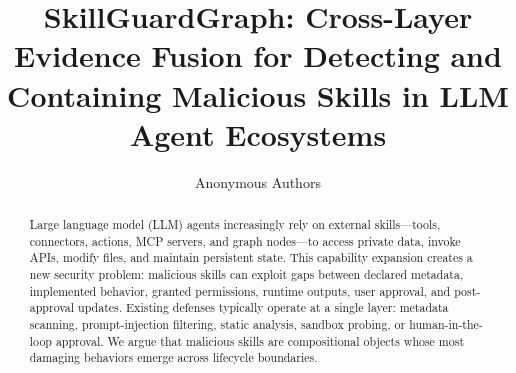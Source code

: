 \documentclass[10pt]{article}
\title{SkillGuardGraph: Cross-Layer Evidence Fusion for Detecting and Containing Malicious Skills in LLM Agent Ecosystems}
\author{Anonymous Authors}
\date{}
\begin{document}
\maketitle

\begin{abstract}
Large language model (LLM) agents increasingly rely on external skills---tools, connectors, actions, MCP servers, and graph nodes---to access private data, invoke APIs, modify files, and maintain persistent state. This capability expansion creates a new security problem: malicious skills can exploit gaps between declared metadata, implemented behavior, granted permissions, runtime outputs, user approval, and post-approval updates. Existing defenses typically operate at a single layer: metadata scanning, prompt-injection filtering, static analysis, sandbox probing, or human-in-the-loop approval. We argue that malicious skills are compositional objects whose most damaging behaviors emerge across lifecycle boundaries.


\end{abstract}
\end{document}
